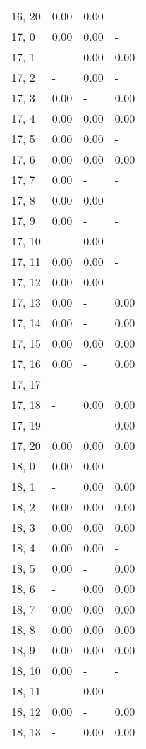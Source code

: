 \begin{table}
\begin{tabular}{llll}
16, 20 &  0.00 &  0.00 &     - \\
17, 0  &  0.00 &  0.00 &     - \\
17, 1  &     - &  0.00 &  0.00 \\
17, 2  &     - &  0.00 &     - \\
17, 3  &  0.00 &     - &  0.00 \\
17, 4  &  0.00 &  0.00 &  0.00 \\
17, 5  &  0.00 &  0.00 &     - \\
17, 6  &  0.00 &  0.00 &  0.00 \\
17, 7  &  0.00 &     - &     - \\
17, 8  &  0.00 &  0.00 &     - \\
17, 9  &  0.00 &     - &     - \\
17, 10 &     - &  0.00 &     - \\
17, 11 &  0.00 &  0.00 &     - \\
17, 12 &  0.00 &  0.00 &     - \\
17, 13 &  0.00 &     - &  0.00 \\
17, 14 &  0.00 &     - &  0.00 \\
17, 15 &  0.00 &  0.00 &  0.00 \\
17, 16 &  0.00 &     - &  0.00 \\
17, 17 &     - &     - &     - \\
17, 18 &     - &  0.00 &  0.00 \\
17, 19 &     - &     - &  0.00 \\
17, 20 &  0.00 &  0.00 &  0.00 \\
18, 0  &  0.00 &  0.00 &     - \\
18, 1  &     - &  0.00 &  0.00 \\
18, 2  &  0.00 &  0.00 &  0.00 \\
18, 3  &  0.00 &  0.00 &  0.00 \\
18, 4  &  0.00 &  0.00 &     - \\
18, 5  &  0.00 &     - &  0.00 \\
18, 6  &     - &  0.00 &  0.00 \\
18, 7  &  0.00 &  0.00 &  0.00 \\
18, 8  &  0.00 &  0.00 &  0.00 \\
18, 9  &  0.00 &  0.00 &  0.00 \\
18, 10 &  0.00 &     - &     - \\
18, 11 &     - &  0.00 &     - \\
18, 12 &  0.00 &     - &  0.00 \\
18, 13 &     - &  0.00 &  0.00 \\

\end{tabular}
\end{table}
